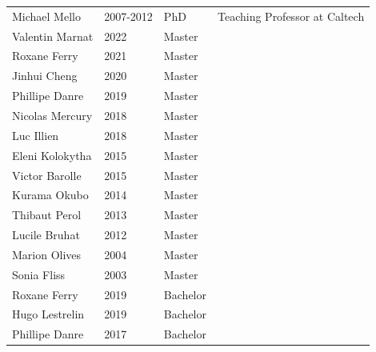 \documentclass[10pt]{article}
\begin{document}
\begin{table}[h!]
\begin{tabular}{L{4cm}L{3cm}L{2cm}D{6cm}}
\color{gray}Michael Mello         & 2007-2012         &  PhD        &  Teaching Professor at Caltech\\[16pt]
\color{gray}Valentin Marnat	  	  & 2022              &  Master     &  \\
\color{gray}Roxane Ferry    	  	  & 2021              &  Master     &  \\
\color{gray}Jinhui Cheng    	      & 2020              &  Master     &  \\
\color{gray}Phillipe Danre    	  & 2019              &  Master     &  \\
\color{gray}Nicolas Mercury    	  & 2018              &  Master     &  \\
\color{gray}Luc Illien      	      & 2018              &  Master     &  \\
\color{gray}Eleni Kolokytha    	  & 2015              &  Master     &  \\
\color{gray}Victor Barolle    	  & 2015              &  Master     &  \\
\color{gray}Kurama Okubo      	  & 2014              &  Master     &  \\
\color{gray}Thibaut Perol      	  & 2013              &  Master     &  \\
\color{gray}Lucile Bruhat      	  & 2012              &  Master     &  \\
\color{gray}Marion Olives      	  & 2004              &  Master     &  \\
\color{gray}Sonia Fliss      	  & 2003              &  Master     &  \\[16pt]
\color{gray}Roxane Ferry    	      & 2019              &  Bachelor   &  \\
\color{gray}Hugo Lestrelin    	  & 2019              &  Bachelor   &  \\
\color{gray}Phillipe Danre    	  & 2017              &  Bachelor   &  \\[12pt]
\end{tabular}
\end{table}
\clearpage
\color{black}
\end{document}
